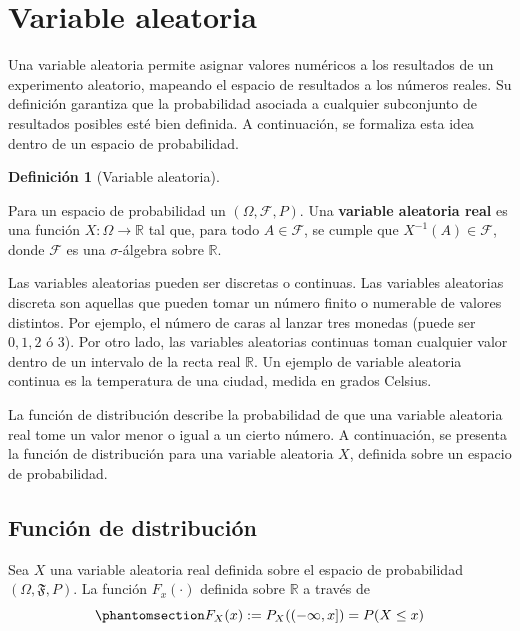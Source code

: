 \documentclass[
  us-letterpaper,
]{scrreprt}
\theoremstyle{plain}
\theoremstyle{definition}
\newtheorem{definition}{Definición}[chapter]
\theoremstyle{definition}
\theoremstyle{remark}
\begin{document}
\section{Variable aleatoria}\label{sec-VA}

Una variable aleatoria permite asignar valores numéricos a los
resultados de un experimento aleatorio, mapeando el espacio de
resultados a los números reales. Su definición garantiza que la
probabilidad asociada a cualquier subconjunto de resultados posibles
esté bien definida. A continuación, se formaliza esta idea dentro de un
espacio de probabilidad.

\begin{definition}[Variable
aleatoria]\protect\hypertarget{def-VA}{}\label{def-VA}

Para un espacio de probabilidad un \((\Omega, \mathcal{F}, P)\). Una
\textbf{variable aleatoria real} es una función
\(X: \Omega \to \mathbb{R}\) tal que, para todo \(A \in \mathcal{F}\),
se cumple que \(X^{-1}(A) \in \mathcal{F}\), donde \(\mathcal{F}\) es
una \(\sigma\)-álgebra sobre \(\mathbb{R}\).

\end{definition}

Las variables aleatorias pueden ser discretas o continuas. Las variables
aleatorias discreta son aquellas que pueden tomar un número finito o
numerable de valores distintos. Por ejemplo, el número de caras al
lanzar tres monedas (puede ser \(0, 1, 2\) ó \(3\)). Por otro lado, las
variables aleatorias continuas toman cualquier valor dentro de un
intervalo de la recta real \(\mathbb{R}\). Un ejemplo de variable
aleatoria continua es la temperatura de una ciudad, medida en grados
Celsius.

La función de distribución describe la probabilidad de que una variable
aleatoria real tome un valor menor o igual a un cierto número. A
continuación, se presenta la función de distribución para una variable
aleatoria \(X\), definida sobre un espacio de probabilidad.

\subsection{Función de
distribución}\label{funciuxf3n-de-distribuciuxf3n}

Sea \(X\) una variable aleatoria real definida sobre el espacio de
probabilidad \((\Omega, \mathfrak{F}, P)\). La función \(F_x(\cdot)\)
definida sobre \(\mathbb{R}\) a través de
\begin{equation}\phantomsection\label{eq-cdf}{
F_X(x) := P_X((-\infty, x]) = P(X \leq x)
}\end{equation}
\end{document}
